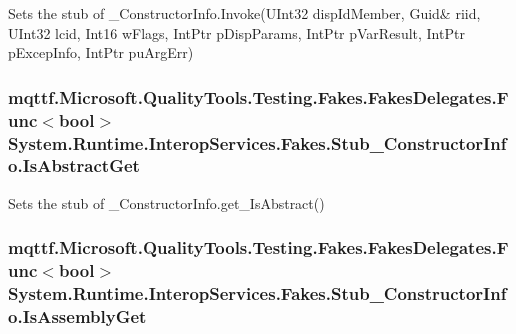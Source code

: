 Sets the stub of \-\_\-\-Constructor\-Info.\-Invoke(U\-Int32 disp\-Id\-Member, Guid\& riid, U\-Int32 lcid, Int16 w\-Flags, Int\-Ptr p\-Disp\-Params, Int\-Ptr p\-Var\-Result, Int\-Ptr p\-Excep\-Info, Int\-Ptr pu\-Arg\-Err)

\hypertarget{class_system_1_1_runtime_1_1_interop_services_1_1_fakes_1_1_stub___constructor_info_a346e440f62fee5af08cc7bbfe949dba3}{
\subsubsection[{Is\-Abstract\-Get}]{\setlength{\rightskip}{0pt plus 5cm}mqttf.\-Microsoft.\-Quality\-Tools.\-Testing.\-Fakes.\-Fakes\-Delegates.\-Func$<$bool$>$ System.\-Runtime.\-Interop\-Services.\-Fakes.\-Stub\-\_\-\-Constructor\-Info.\-Is\-Abstract\-Get}}\label{class_system_1_1_runtime_1_1_interop_services_1_1_fakes_1_1_stub___constructor_info_a346e440f62fee5af08cc7bbfe949dba3}


Sets the stub of \-\_\-\-Constructor\-Info.\-get\-\_\-\-Is\-Abstract()

\hypertarget{class_system_1_1_runtime_1_1_interop_services_1_1_fakes_1_1_stub___constructor_info_a095bcb186eb9fb934e844b01852b020b}{
\subsubsection[{Is\-Assembly\-Get}]{\setlength{\rightskip}{0pt plus 5cm}mqttf.\-Microsoft.\-Quality\-Tools.\-Testing.\-Fakes.\-Fakes\-Delegates.\-Func$<$bool$>$ System.\-Runtime.\-Interop\-Services.\-Fakes.\-Stub\-\_\-\-Constructor\-Info.\-Is\-Assembly\-Get}}\label{class_system_1_1_runtime_1_1_interop_services_1_1_fakes_1_1_stub___constructor_info_a095bcb186eb9fb934e844b01852b020b}


